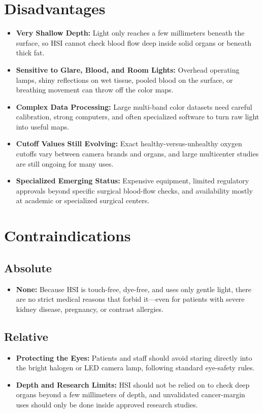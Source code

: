 \section{Disadvantages}
\begin{itemize}
    \item \textbf{Very Shallow Depth:} Light only reaches a few millimeters beneath the surface, so HSI cannot check blood flow deep inside solid organs or beneath thick fat.
    \item \textbf{Sensitive to Glare, Blood, and Room Lights:} Overhead operating lamps, shiny reflections on wet tissue, pooled blood on the surface, or breathing movement can throw off the color maps.
    \item \textbf{Complex Data Processing:} Large multi-band color datasets need careful calibration, strong computers, and often specialized software to turn raw light into useful maps.
    \item \textbf{Cutoff Values Still Evolving:} Exact healthy-versus-unhealthy oxygen cutoffs vary between camera brands and organs, and large multicenter studies are still ongoing for many uses.
    \item \textbf{Specialized Emerging Status:} Expensive equipment, limited regulatory approvals beyond specific surgical blood-flow checks, and availability mostly at academic or specialized surgical centers.
\end{itemize}

\section{Contraindications}

\subsection{Absolute}
\begin{itemize}
    \item \textbf{None:} Because HSI is touch-free, dye-free, and uses only gentle light, there are no strict medical reasons that forbid it---even for patients with severe kidney disease, pregnancy, or contrast allergies.
\end{itemize}

\subsection{Relative}
\begin{itemize}
    \item \textbf{Protecting the Eyes:} Patients and staff should avoid staring directly into the bright halogen or LED camera lamp, following standard eye-safety rules.
    \item \textbf{Depth and Research Limits:} HSI should not be relied on to check deep organs beyond a few millimeters of depth, and unvalidated cancer-margin uses should only be done inside approved research studies.
\end{itemize}

